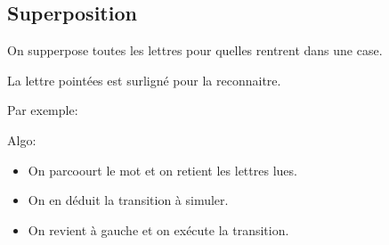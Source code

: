 \documentclass{article}
\theoremstyle{plain}
\theoremstyle{nonumberplain}
\begin{document}
\subsection{Superposition}

  On supperpose toutes les lettres pour quelles rentrent dans une case.

  La lettre pointées est surligné pour la reconnaitre.

  Par exemple:


  Algo: 

  \begin{itemize}
    
    \item On parcoourt le mot et on retient les lettres lues. 

    \item On en déduit la transition à simuler.

    \item On revient à gauche et on exécute la transition. 
  \end{itemize}
\end{document}
